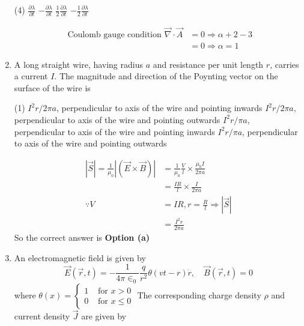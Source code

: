 \begin{enumerate}
\begin{minipage}{\textwidth}
	\end{minipage}
	\begin{tasks}(4)
		\task[\textbf{a.}] $\frac{\partial \lambda}{\partial t}$
		\task[\textbf{b.}]$-\frac{\partial \lambda}{\partial t}$
		\task[\textbf{c.}]$\frac{1}{2} \frac{\partial \lambda}{\partial t}$
		\task[\textbf{d.}]$-\frac{1}{2} \frac{\partial \lambda}{\partial t}$
	\end{tasks}
\begin{answer}
	\begin{align*}
	\text{	Coulomb gauge condition }\vec{\nabla} \cdot \vec{A}&=0 \Rightarrow \alpha+2-3\\&=0 \Rightarrow \alpha=1
	\end{align*}
\end{answer}
	\item A long straight wire, having radius $a$ and resistance per unit length $r$, carries a current $I$. The magnitude and direction of the Poynting vector on the surface of the wire is
	{}
	\begin{tasks}(1)
		\task[\textbf{A.}] $I^{2} r / 2 \pi a$, perpendicular to axis of the wire and pointing inwards
		\task[\textbf{B.}]$I^{2} r / 2 \pi a$, perpendicular to axis of the wire and pointing outwards
		\task[\textbf{C.}]$I^{2} r / \pi a$, perpendicular to axis of the wire and pointing inwards
		\task[\textbf{D.}]$I^{2} r / \pi a$, perpendicular to axis of the wire and pointing outwards
	\end{tasks}
\begin{answer}
	\begin{align*}
	|\vec{S}|=\frac{1}{\mu_{0}}|(\vec{E} \times \vec{B})|&=\frac{1}{\mu_{0}} \frac{V}{l} \times \frac{\mu_{0} I}{2 \pi a}\\&=\frac{I R}{l} \times \frac{I}{2 \pi a}\\
	\because V&=I R, r=\frac{R}{l} \Rightarrow|\vec{S}|\\&=\frac{I^{2} r}{2 \pi a}
	\end{align*}
	So the correct answer is \textbf{Option (a)}
\end{answer}
	\item  An electromagnetic field is given by
	$$
	\vec{E}(\vec{r}, t)=-\frac{1}{4 \pi \in_{0}} \frac{q}{r^{2}} \theta(v t-r) \dot{r}, \quad \vec{B}(\vec{r}, t)=0
	$$
	where $\theta(x)= \begin{cases}1 & \text { for } x>0 \\ 0 & \text { for } x \leq 0\end{cases}$
	The corresponding charge density $\rho$ and current density $\vec{J}$ are given by

\end{enumerate}

